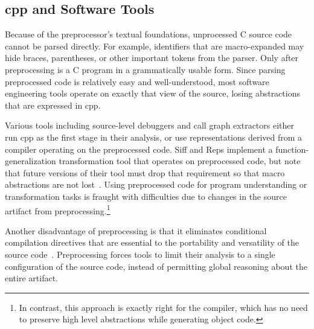 \documentclass{article}
\newcommand{\Cpp}{\mbox{\textsf{cpp}}}
\newcommand{\C}{\mbox{C}}
\newcommand{\ppd}[1]{\texttt{\##1}}
\begin{document}
\subsection{\Cpp{} and Software Tools}

Because of the preprocessor's textual foundations, unprocessed \C{} source code
cannot be parsed directly.  For example, identifiers that are macro-expanded may
hide braces, parentheses, or other 
important tokens from the parser.  Only after preprocessing is a \C{} program
in a grammatically usable form. Since parsing
preprocessed code is relatively easy and well-understood,
most software engineering tools operate on
exactly that view of the source, losing abstractions that are
expressed in \Cpp{}.  

Various tools including source-level debuggers and call graph extractors
either run \Cpp{} as the first stage in their analysis, or use
representations derived from a compiler operating on the preprocessed
code.  Siff and Reps implement a function-generalization transformation
tool that operates on preprocessed code, but note that future versions
of their tool must drop that requirement so that macro abstractions are
not lost~\cite{Siff96}. Using preprocessed code for program
understanding or transformation tasks is fraught with difficulties due
to changes in the source artifact from preprocessing.\footnote{In
  contrast, this approach is exactly right for the compiler, which has
  no need to preserve high level abstractions while generating object
  code.}


Another disadvantage of preprocessing is that it eliminates
conditional compilation directives that are essential to the portability
and versatility of the source code~\cite{Krone94}.  Preprocessing
forces tools to limit their analysis to a single configuration of the
source code, instead of permitting global reasoning about the entire
artifact.  
\end{document}
